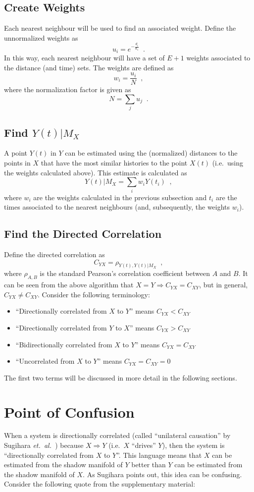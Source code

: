 \documentclass[a4paper,11pt]{article}
\begin{document}
\subsection{Create Weights}
Each nearest neighbour will be used to find an associated weight.  Define the unnormalized weights as
$$
u_i = e^{-\frac{d_i}{d_1}}\;\;.
$$
In this way, each nearest neighbour will have a set of $E+1$ weights associated to the distance (and time) sets.  The weights are defined as
$$
w_i = \frac{u_i}{N}\;\;,
$$
where the normalization factor is given as
$$
N = \sum_j u_j\;\;.
$$

\subsection{Find $Y(t)|M_X$}
A point $Y(t)$ in $Y$ can be estimated using the (normalized) distances to the points in $X$ that have the most similar histories to the point $X(t)$ (i.e.\ using the weights calculated above).  This estimate is calculated as
$$
Y(t)|M_X = \sum_i w_i Y(t_i)\;\;,
$$
where $w_i$ are the weights calculated in the previous subsection and $t_i$ are the times associated to the nearest neighbours (and, subsequently, the weights $w_i$).

\subsection{Find the Directed Correlation}
Define the directed correlation as 
$$
C_{YX} = \rho_{Y(t),Y(t)|M_X}\;\;,
$$
where $\rho_{A,B}$ is the standard Pearson's correlation coefficient between $A$ and $B$.  It can be seen from the above algorithm that $X=Y \Rightarrow C_{YX}=C_{XY}$, but in general, $C_{YX}\neq C_{XY}$.  Consider the following terminology:
\begin{itemize}
\item ``Directionally correlated from $X$ to $Y$'' means $C_{YX} < C_{XY}$
\item ``Directionally correlated from $Y$ to $X$'' means $C_{YX} > C_{XY}$
\item ``Bidirectionally correlated from $X$ to $Y$'' means $C_{YX} = C_{XY}$
\item ``Uncorrelated from $X$ to $Y$'' means $C_{YX} = C_{XY}=0$
\end{itemize}
The first two terms will be discussed in more detail in the following sections.

\section{Point of Confusion}
When a system is directionally correlated (called ``unilateral causation'' by Sugihara {\em et.\ al.\ }) because $X\Rightarrow Y$ (i.e.\ $X$ ``drives'' $Y$), then the system is ``directionally correlated from $X$ to $Y$''.  This language means that $X$ can be estimated from the shadow manifold of $Y$ better than $Y$ can be estimated from the shadow manifold of $X$.  As Sugihara points out, this idea can be confusing.  Consider the following quote from the supplementary material:
\end{document}
